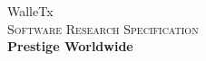 \begin{titlepage}
  \thispagestyle{titlestyle}
  \begin{center}

  {\fontsize{80}{96}\selectfont WalleTx}\\[0.6cm]

    \textsc{\normalsize Software Research Specification}\\[0.5cm]

    { \large \bfseries Prestige Worldwide\\[0.4cm] }



  \end{center}
  \restoregeometry
\end{titlepage}
